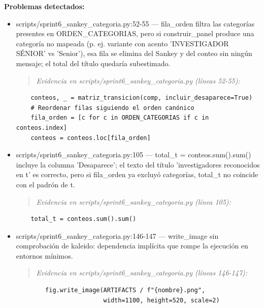 \begin{tcolorbox}[riesgo]
\textbf{Problemas detectados:}
\begin{itemize}
  \item scripts/sprint6\_sankey\_categoria.py:52-55 --- fila\_orden filtra las categorías presentes en ORDEN\_CATEGORIAS, pero si construir\_panel produce una categoría no mapeada (p. ej. variante con acento 'INVESTIGADOR SÉNIOR' vs 'Senior'), esa fila se elimina del Sankey y del conteo sin ningún mensaje; el total del título quedaría subestimado.
\begin{quote}\footnotesize\ttfamily
\noindent\emph{Evidencia en scripts/sprint6\_sankey\_categoria.py (líneas 52-55):}
\end{quote}
\begin{lstlisting}
    conteos, _ = matriz_transicion(comp, incluir_desaparece=True)
    # Reordenar filas siguiendo el orden canónico
    fila_orden = [c for c in ORDEN_CATEGORIAS if c in conteos.index]
    conteos = conteos.loc[fila_orden]
\end{lstlisting}

  \item scripts/sprint6\_sankey\_categoria.py:105 --- total\_t = conteos.sum().sum() incluye la columna 'Desaparece'; el texto del título 'investigadores reconocidos en t' es correcto, pero si fila\_orden ya excluyó categorías, total\_t no coincide con el padrón de t.
\begin{quote}\footnotesize\ttfamily
\noindent\emph{Evidencia en scripts/sprint6\_sankey\_categoria.py (línea 105):}
\end{quote}
\begin{lstlisting}
    total_t = conteos.sum().sum()
\end{lstlisting}

  \item scripts/sprint6\_sankey\_categoria.py:146-147 --- write\_image sin comprobación de kaleido: dependencia implícita que rompe la ejecución en entornos mínimos.
\begin{quote}\footnotesize\ttfamily
\noindent\emph{Evidencia en scripts/sprint6\_sankey\_categoria.py (líneas 146-147):}
\end{quote}
\begin{lstlisting}
        fig.write_image(ARTIFACTS / f"{nombre}.png",
                        width=1100, height=520, scale=2)
\end{lstlisting}

\end{itemize}
\end{tcolorbox}


